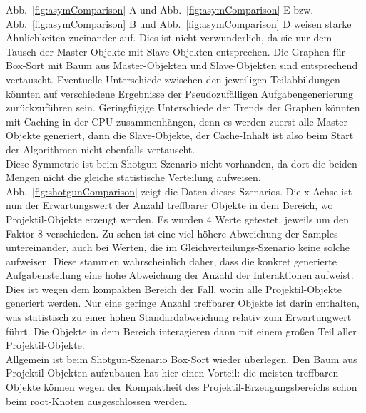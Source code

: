 Abb.~\ref{fig:asymComparison} A und Abb.~\ref{fig:asymComparison} E bzw. Abb.~\ref{fig:asymComparison} B und Abb.~\ref{fig:asymComparison} D weisen starke Ähnlichkeiten zueinander auf. Dies ist nicht verwunderlich, da sie nur dem Tausch der Master-Objekte mit Slave-Objekten entsprechen. Die Graphen für Box-Sort mit Baum aus Master-Objekten und Slave-Objekten sind entsprechend vertauscht. Eventuelle Unterschiede zwischen den jeweiligen Teilabbildungen könnten auf verschiedene Ergebnisse der Pseudozufälligen Aufgabengenerierung zurückzuführen sein. Geringfügige Unterschiede der Trends der Graphen könnten mit Caching in der CPU zusammenhängen, denn es werden zuerst alle Master-Objekte generiert, dann die Slave-Objekte, der Cache-Inhalt ist also beim Start der Algorithmen nicht ebenfalls vertauscht.\\
Diese Symmetrie ist beim Shotgun-Szenario nicht vorhanden, da dort die beiden Mengen nicht die gleiche statistische Verteilung aufweisen. Abb.~\ref{fig:shotgunComparison} zeigt die Daten dieses Szenarios. Die x-Achse ist nun der Erwartungswert der Anzahl treffbarer Objekte in dem Bereich, wo Projektil-Objekte erzeugt werden. Es wurden 4 Werte getestet, jeweils um den Faktor 8 verschieden. Zu sehen ist eine viel höhere Abweichung der Samples untereinander, auch bei Werten, die im Gleichverteilungs-Szenario keine solche aufweisen. Diese stammen wahrscheinlich daher, dass die konkret generierte Aufgabenstellung eine hohe Abweichung der Anzahl der Interaktionen aufweist. Dies ist wegen dem kompakten Bereich der Fall, worin alle Projektil-Objekte generiert werden. Nur eine geringe Anzahl treffbarer Objekte ist darin enthalten, was statistisch zu einer hohen Standardabweichung relativ zum Erwartungwert führt. Die Objekte in dem Bereich interagieren dann mit einem großen Teil aller Projektil-Objekte.\\
Allgemein ist beim Shotgun-Szenario Box-Sort wieder überlegen. Den Baum aus Projektil-Objekten aufzubauen hat hier einen Vorteil: die meisten treffbaren Objekte können wegen der Kompaktheit des Projektil-Erzeugungsbereichs schon beim root-Knoten ausgeschlossen werden.\\

